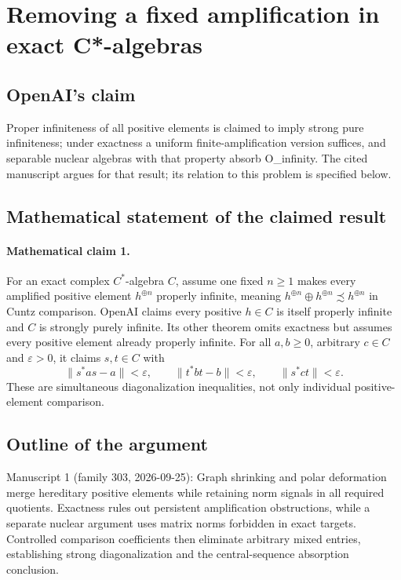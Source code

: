 \documentclass[11pt]{article}
\begin{document}
\section*{Removing a fixed amplification in exact C*-algebras}

\subsection{OpenAI's claim}
Proper infiniteness of all positive elements is claimed to imply strong pure infiniteness; under exactness a uniform finite-amplification version suffices, and separable nuclear algebras with that property absorb O\_infinity. The cited manuscript argues for that result; its relation to this problem is specified below.

\subsection{Mathematical statement of the claimed result}
\paragraph{Mathematical claim 1.} For an exact complex $C^*$-algebra $C$, assume one fixed $n\ge1$ makes every amplified positive element $h^{\oplus n}$ properly infinite, meaning $h^{\oplus n}\oplus h^{\oplus n}\precsim h^{\oplus n}$ in Cuntz comparison. OpenAI claims every positive $h\in C$ is itself properly infinite and $C$ is strongly purely infinite.
Its other theorem omits exactness but assumes every positive element already properly infinite. For all $a,b\ge0$, arbitrary $c\in C$ and $\varepsilon>0$, it claims $s,t\in C$ with
\[
\|s^*as-a\|<\varepsilon,\qquad\|t^*bt-b\|<\varepsilon,\qquad\|s^*ct\|<\varepsilon.
\]
These are simultaneous diagonalization inequalities, not only individual positive-element comparison.

\subsection{Outline of the argument}
Manuscript 1 (family 303, 2026-09-25): Graph shrinking and polar deformation merge hereditary positive elements while retaining norm signals in all required quotients. Exactness rules out persistent amplification obstructions, while a separate nuclear argument uses matrix norms forbidden in exact targets. Controlled comparison coefficients then eliminate arbitrary mixed entries, establishing strong diagonalization and the central-sequence absorption conclusion.
\end{document}
